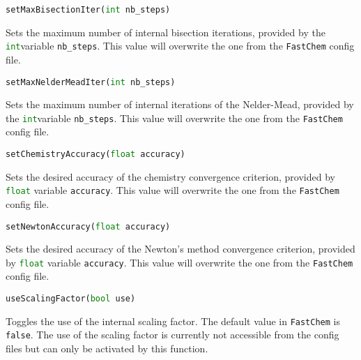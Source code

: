 \documentclass[numbers=noenddot]{aux/fcmanual}
\newcommand{\fc}{\texttt{FastChem}\xspace}
\begin{document}
\bigbreak

\lstinline[language=Python]!setMaxBisectionIter(int nb_steps)!
\begin{addmargin}[25pt]{0pt}
	Sets the maximum number of internal bisection iterations, provided by the \lstinline[language=Python]!int!\footnotemark[\value{footnote}] variable \lstinline!nb_steps!. This value will overwrite the one from the \fc config file.
\end{addmargin}

\bigbreak

\lstinline[language=Python]!setMaxNelderMeadIter(int nb_steps)!
\begin{addmargin}[25pt]{0pt}
	Sets the maximum number of internal iterations of the Nelder-Mead, provided by the \lstinline[language=Python]!int!\footnotemark[\value{footnote}] variable \lstinline!nb_steps!. This value will overwrite the one from the \fc config file.
\end{addmargin}

\bigbreak

\lstinline[language=Python]!setChemistryAccuracy(float accuracy)!
\begin{addmargin}[25pt]{0pt}
	Sets the desired accuracy of the chemistry convergence criterion, provided by \lstinline[language=Python]!float! variable \lstinline!accuracy!. This value will overwrite the one from the \fc config file.
\end{addmargin}

\bigbreak

\lstinline[language=Python]!setNewtonAccuracy(float accuracy)!
\begin{addmargin}[25pt]{0pt}
	Sets the desired accuracy of the Newton's method convergence criterion, provided by \lstinline[language=Python]!float! variable \lstinline!accuracy!. This value will overwrite the one from the \fc config file.
\end{addmargin}

\bigbreak

\lstinline[language=Python]!useScalingFactor(bool use)!
\begin{addmargin}[25pt]{0pt}
	Toggles the use of the internal scaling factor. The default value in \fc is \lstinline[language=Python]!false!. The use of the scaling factor is currently not accessible from the config files but can only be activated by this function.
\end{addmargin}





  
\end{document}
